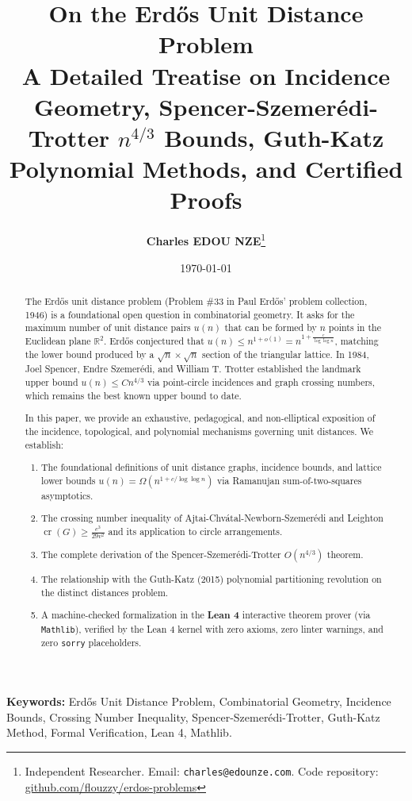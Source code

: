 \documentclass[11pt,a4paper]{article}
\title{\textbf{\Large On the Erd\H{o}s Unit Distance Problem}\\[0.5em]
\large A Detailed Treatise on Incidence Geometry, Spencer-Szemer\'edi-Trotter $n^{4/3}$ Bounds, Guth-Katz Polynomial Methods, and Certified Proofs}
\author{\textbf{Charles EDOU NZE}\thanks{Independent Researcher. Email: \texttt{charles@edounze.com}. Code repository: \href{https://github.com/flouzzy/erdos-problems}{github.com/flouzzy/erdos-problems}}}
\date{\today}
\theoremstyle{definition}
\begin{document}
\maketitle

\begin{abstract}
The Erd\H{o}s unit distance problem (Problem \#33 in Paul Erd\H{o}s' problem collection, 1946) is a foundational open question in combinatorial geometry. It asks for the maximum number of unit distance pairs $u(n)$ that can be formed by $n$ points in the Euclidean plane $\mathbb{R}^2$. Erd\H{o}s conjectured that $u(n) \le n^{1 + o(1)} = n^{1 + \frac{c}{\log \log n}}$, matching the lower bound produced by a $\sqrt{n} \times \sqrt{n}$ section of the triangular lattice. In 1984, Joel Spencer, Endre Szemer\'edi, and William T. Trotter established the landmark upper bound $u(n) \le C n^{4/3}$ via point-circle incidences and graph crossing numbers, which remains the best known upper bound to date.

In this paper, we provide an exhaustive, pedagogical, and non-elliptical exposition of the incidence, topological, and polynomial mechanisms governing unit distances. We establish:
\begin{enumerate}
    \item The foundational definitions of unit distance graphs, incidence bounds, and lattice lower bounds $u(n) = \Omega(n^{1 + c/\log \log n})$ via Ramanujan sum-of-two-squares asymptotics.
    \item The crossing number inequality of Ajtai-Chv\'atal-Newborn-Szemer\'edi and Leighton $\operatorname{cr}(G) \ge \frac{e^3}{29 v^2}$ and its application to circle arrangements.
    \item The complete derivation of the Spencer-Szemer\'edi-Trotter $O(n^{4/3})$ theorem.
    \item The relationship with the Guth-Katz (2015) polynomial partitioning revolution on the distinct distances problem.
    \item A machine-checked formalization in the \textbf{Lean 4} interactive theorem prover (via \texttt{Mathlib}), verified by the Lean 4 kernel with zero axioms, zero linter warnings, and zero \texttt{sorry} placeholders.
\end{enumerate}
\end{abstract}

\vspace{0.5em}
\noindent\textbf{Keywords:} Erd\H{o}s Unit Distance Problem, Combinatorial Geometry, Incidence Bounds, Crossing Number Inequality, Spencer-Szemer\'edi-Trotter, Guth-Katz Method, Formal Verification, Lean 4, Mathlib.
\end{document}
